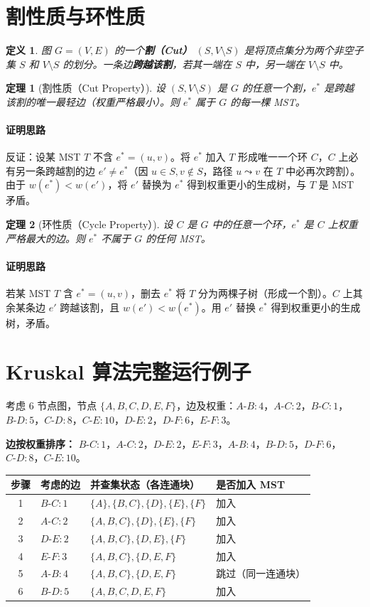 \documentclass[UTF8,openany,12pt]{ctexbook}
\newtheorem{definition}{定义}[chapter]
\newtheorem{theorem}{定理}[chapter]
\theoremstyle{remark}
\newcommand{\proofidea}[1]{\paragraph{证明思路}#1}
\begin{document}
\section{割性质与环性质}

\begin{definition}
图 $G=(V,E)$ 的一个\textbf{割（Cut）} $(S, V\setminus S)$ 是将顶点集分为两个非空子集 $S$ 和 $V\setminus S$ 的划分。一条边\textbf{跨越该割}，若其一端在 $S$ 中，另一端在 $V\setminus S$ 中。
\end{definition}

\begin{theorem}[割性质（Cut Property）]
设 $(S, V\setminus S)$ 是 $G$ 的任意一个割，$e^*$ 是跨越该割的唯一最轻边（权重严格最小）。则 $e^*$ 属于 $G$ 的\emph{每一棵} MST。
\end{theorem}

\proofidea{反证：设某 MST $T$ 不含 $e^*=(u,v)$。将 $e^*$ 加入 $T$ 形成唯一一个环 $C$，$C$ 上必有另一条跨越割的边 $e' \ne e^*$（因 $u\in S, v\notin S$，路径 $u\leadsto v$ 在 $T$ 中必再次跨割）。由于 $w(e^*) < w(e')$，将 $e'$ 替换为 $e^*$ 得到权重更小的生成树，与 $T$ 是 MST 矛盾。}

\begin{theorem}[环性质（Cycle Property）]
设 $C$ 是 $G$ 中的任意一个环，$e^*$ 是 $C$ 上权重严格最大的边。则 $e^*$ 不属于 $G$ 的任何 MST。
\end{theorem}

\proofidea{若某 MST $T$ 含 $e^*=(u,v)$，删去 $e^*$ 将 $T$ 分为两棵子树（形成一个割）。$C$ 上其余某条边 $e'$ 跨越该割，且 $w(e') < w(e^*)$。用 $e'$ 替换 $e^*$ 得到权重更小的生成树，矛盾。}

\section{Kruskal 算法完整运行例子}

考虑 6 节点图，节点 $\{A,B,C,D,E,F\}$，边及权重：$A\text{-}B:4$，$A\text{-}C:2$，$B\text{-}C:1$，$B\text{-}D:5$，$C\text{-}D:8$，$C\text{-}E:10$，$D\text{-}E:2$，$D\text{-}F:6$，$E\text{-}F:3$。

\textbf{边按权重排序：} $B\text{-}C:1$，$A\text{-}C:2$，$D\text{-}E:2$，$E\text{-}F:3$，$A\text{-}B:4$，$B\text{-}D:5$，$D\text{-}F:6$，$C\text{-}D:8$，$C\text{-}E:10$。

\begin{center}
\begin{tabular}{@{}clll@{}}
\toprule
步骤 & 考虑的边 & 并查集状态（各连通块） & 是否加入 MST \\
\midrule
1 & $B\text{-}C:1$ & $\{A\},\{B,C\},\{D\},\{E\},\{F\}$ & 加入 \\
2 & $A\text{-}C:2$ & $\{A,B,C\},\{D\},\{E\},\{F\}$ & 加入 \\
3 & $D\text{-}E:2$ & $\{A,B,C\},\{D,E\},\{F\}$ & 加入 \\
4 & $E\text{-}F:3$ & $\{A,B,C\},\{D,E,F\}$ & 加入 \\
5 & $A\text{-}B:4$ & $\{A,B,C\},\{D,E,F\}$ & 跳过（同一连通块） \\
6 & $B\text{-}D:5$ & $\{A,B,C,D,E,F\}$ & 加入 \\
\bottomrule
\end{tabular}
\end{center}
\end{document}
